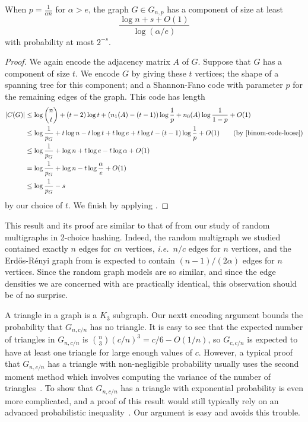 
\begin{thm}
  When $p = \frac{1}{\alpha n}$ for $\alpha > e$, the graph
  $G \in G_{n, p}$ has a component of size at least
  \[
  \frac{\log n + s + O(1)}{\log (\alpha/e)}
  \]
  with probability at most $2^{-s}$.
\end{thm}
\begin{proof}
  We again encode the adjacency matrix $A$ of $G$. Suppose that $G$
  has a component of size $t$. We encode $G$ by giving these $t$
  vertices; the shape of a spanning tree for this component; and a
  Shannon-Fano code with parameter $p$ for the remaining edges of the
  graph. This code has length
  \begin{align*}
    |C(G)| &\leq \log \binom{n}{t} + (t - 2) \log t + (n_1(A) - (t - 1))\log \frac{1}{p} + n_0(A) \log \frac{1}{1 - p} + O(1) \\
           &\leq \log \frac{1}{p_G} + t \log n - t \log t + t \log e + t \log t - (t - 1) \log \frac{1}{p} + O(1) \tag{by \eqref{binom-code-loose}} \\
           &\leq \log \frac{1}{p_G} + \log n + t \log e - t \log \alpha + O(1) \\
           &= \log \frac{1}{p_G} + \log n - t \log \frac{\alpha}{e} + O(1) \\
           &\leq \log \frac{1}{p_G} - s
  \end{align*}
  by our choice of $t$. We finish by applying .
\end{proof}
\begin{rem}
  This result and its proof are similar to that of
   from our study of random
  multigraphs in 2-choice hashing. Indeed, the random multigraph we
  studied contained exactly $n$ edges for $cn$ vertices,
  \emph{i.e.}~$n/c$ edges for $n$ vertices, and the
  Erd\H{o}s-R\'{e}nyi graph from  is
  expected to contain $(n - 1)/(2 \alpha)$ edges for $n$
  vertices. Since the random graph models are so similar, and since
  the edge densities we are concerned with are practically identical,
  this observation should be of no surprise.
\end{rem}

A triangle in a graph is a $K_3$ subgraph. Our nextt encoding argument
bounds the probability that $G_{n, c/n}$ has no triangle. It is easy
to see that the expected number of triangles in $G_{n, c/n}$ is
$\binom{n}{3} (c/n)^3 = c/6 - O(1/n)$, so $G_{c, c/n}$ is expected to
have at least one triangle for large enough values of $c$. However, a
typical proof that $G_{n, c/n}$ has a triangle with non-negligible
probability usually uses the second moment method which involves
computing the variance of the number of
triangles~\cite{souza:notes}. To show that $G_{n, c/n}$ has a triangle
with exponential probability is even more complicated, and a proof of
this result would still typically rely on an advanced probabilistic
inequality~\cite{alon:probabilistic}. Our argument is easy and avoids
this trouble.

